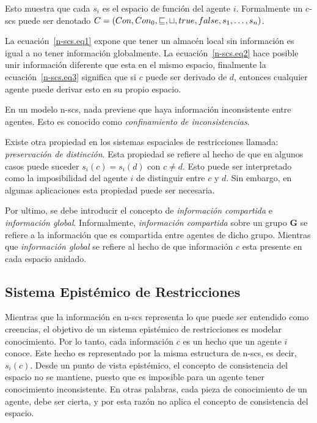 Esto muestra que cada $s_i$ es el espacio de funci\'on del agente $i$. Formalmente un c-scs puede ser denotado $C = (Con, Con_0, \sqsubseteq, \sqcup, true, false, s_1, \mathellipsis, s_n)$. 

La ecuaci\'on~\ref{n-scs.eq1} expone que tener un almac\'en local sin informaci\'on es igual a no tener informaci\'on globalmente.  La ecuaci\'on~\ref{n-scs.eq2} hace posible unir informaci\'on diferente que esta en el mismo espacio, finalmente la ecuaci\'on~\ref{n-scs.eq3} significa que si $c$ puede ser derivado de $d$, entonces cualquier agente puede derivar esto en su propio espacio.

En un modelo n-scs, nada previene que haya informaci\'on inconsistente entre agentes. Esto es conocido como \textit{confinamiento de inconsistencias}.

Existe otra propiedad en los sistemas espaciales de restricciones llamada: \textit{preservaci\'on de distinci\'on}. Esta propiedad se refiere al hecho de que en algunos casos puede suceder $s_i(c)=s_i(d)$ con $c\neq d$. Esto puede ser interpretado como la imposibilidad del agente $i$ de distinguir entre $c$ y $d$. Sin embargo, en algunas aplicaciones esta propiedad puede ser necesaria.

Por ultimo, se debe introducir el concepto de \textit{informaci\'on compartida} e \textit{informaci\'on global}. Informalmente, \textit{informaci\'on compartida} sobre un grupo \textbf{G} se refiere a la informaci\'on que es compartida entre agentes de dicho grupo. Mientras que \textit{informaci\'on global} se refiere al hecho de que informaci\'on $c$ esta presente en cada espacio anidado.

\subsection{Sistema Epist\'emico de Restricciones}
\label{sepr.cap3}

Mientras que la informaci\'on en n-scs representa lo que puede ser entendido como creencias, el objetivo de un sistema epist\'emico de restricciones es modelar conocimiento. Por lo tanto, cada informaci\'on $c$ es un hecho que un agente $i$ conoce. Este hecho es representado por la misma estructura de n-scs, es decir, $s_i(c)$. Desde un punto de vista epist\'emico, el concepto de consistencia del espacio no se mantiene, puesto que es imposible para un agente tener conocimiento inconsistente. En otras palabras, cada pieza de conocimiento de un agente, debe ser cierta, y por esta raz\'on no aplica el concepto de consistencia del espacio.

